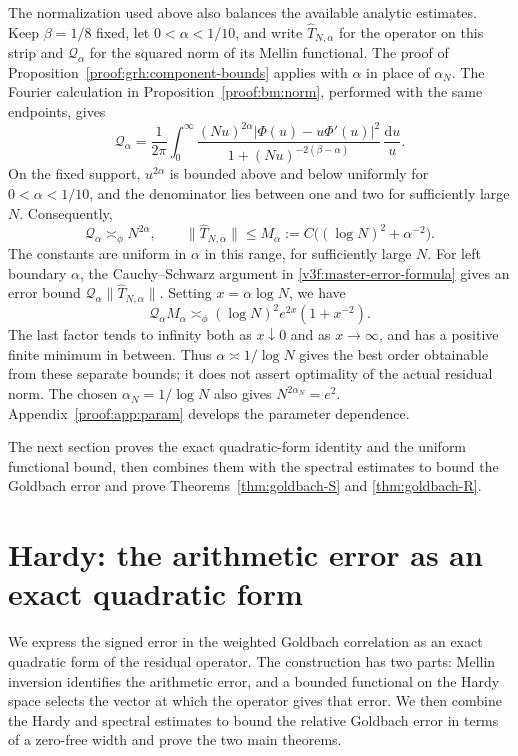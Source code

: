 \documentclass[12pt,a4paper]{amsart}
\numberwithin{equation}{section}
\def\le{\leqslant}
\theoremstyle{plain}
\theoremstyle{definition}
\theoremstyle{remark}
\begin{document}
The normalization used above also balances the available analytic
estimates. Keep $\beta=1/8$ fixed, let $0<\alpha<1/10$, and write
$\widehat T_{N,\alpha}$ for the operator on this strip and
$\mathcal Q_\alpha$ for the squared norm of its Mellin functional.
The proof of Proposition~\ref{proof:grh:component-bounds} applies
with $\alpha$ in place of $\alpha_N$. The Fourier calculation in
Proposition~\ref{proof:bm:norm}, performed with the same endpoints,
gives
\[
 \mathcal Q_\alpha=\frac1{2\pi}\int_0^\infty
 \frac{(Nu)^{2\alpha}|\Phi(u)-u\Phi'(u)|^2}
      {1+(Nu)^{-2(\beta-\alpha)}}\,\frac{\mathrm{d}u}{u}.
\]
On the fixed support, $u^{2\alpha}$ is bounded above and below
uniformly for $0<\alpha<1/10$, and the denominator lies between
one and two for sufficiently large $N$. Consequently,
\[
 \mathcal Q_\alpha\asymp_\phi N^{2\alpha},\qquad
 \|\widehat T_{N,\alpha}\|\le M_\alpha
 :=C\bigl((\log N)^2+\alpha^{-2}\bigr).
\]
The constants are uniform in $\alpha$ in this range, for
sufficiently large $N$. For left boundary $\alpha$, the
Cauchy--Schwarz argument in \eqref{v3f:master-error-formula} gives
an error bound $\mathcal Q_\alpha\|\widehat T_{N,\alpha}\|$.
Setting $x=\alpha\log N$, we have
\[
 \mathcal Q_\alpha M_\alpha
 \asymp_\phi(\log N)^2e^{2x}(1+x^{-2}).
\]
The last factor tends to infinity both as $x\downarrow0$ and
as $x\to\infty$, and has a positive finite minimum in between.
Thus $\alpha\asymp1/\log N$ gives the best order obtainable
from these separate bounds; it does not assert optimality of
the actual residual norm. The chosen $\alpha_N=1/\log N$
also gives $N^{2\alpha_N}=e^2$.
Appendix~\ref{proof:app:param} develops the parameter dependence.

The next section proves the exact quadratic-form identity and the
uniform functional bound, then combines them with the spectral
estimates to bound the Goldbach error and prove
Theorems~\ref{thm:goldbach-S} and \ref{thm:goldbach-R}.

\section{Hardy: the arithmetic error as an exact quadratic form}
\label{proof:sec:v3-mellin-operator}\label{proof:v7:hardy-error}\label{proof:detail:hardy}

We express the signed error in the weighted Goldbach correlation as
an exact quadratic form of the residual operator. The construction
has two parts: Mellin inversion identifies the arithmetic error,
and a bounded functional on the Hardy space selects the vector at
which the operator gives that error. We then combine the Hardy
and spectral estimates to bound the relative Goldbach error in
terms of a zero-free width and prove the two main theorems.
\end{document}
